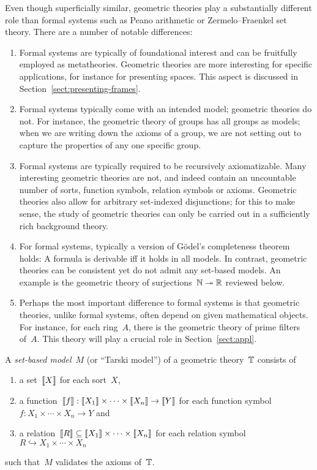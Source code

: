 \documentclass{ws-rv9x6}
\begin{document}
{{\begin{table}[t]
{\begin{minipage}{0.8\textwidth}
  \end{minipage}}
  \label{table:first-order-logic}
\end{table}}

Even though superficially similar, geometric theories play a
substantially different role than formal systems such as Peano arithmetic or
Zermelo--Fraenkel set theory. There are a number of notable differences:
\begin{enumerate}
\item Formal systems are typically of foundational interest and can be
fruitfully employed as metatheories. Geometric theories are more interesting
for specific applications, for instance for presenting spaces. This aspect is discussed
in Section~\ref{sect:presenting-frames}.
\item Formal systems typically come with an intended model; geometric theories
do not. For instance, the geometric theory of groups has all groups as models;
when we are writing down the axioms of a group, we are not setting out to
capture the properties of any one specific group.
\item Formal systems are typically required to be recursively
axiomatizable. Many interesting geometric theories are not, and indeed contain
an uncountable number of sorts, function symbols, relation symbols or axioms. Geometric theories also allow for arbitrary
set-indexed disjunctions; for this to make sense, the study of geometric
theories can only be carried out in a sufficiently rich background theory.
\item For formal systems, typically a version of Gödel's completeness theorem
holds: A formula is derivable iff it holds in all models. In contrast,
geometric theories can be consistent yet do not admit any set-based models. An
example is the geometric theory of surjections~$\mathbb{N} \twoheadrightarrow \mathbb{R}$
reviewed below.
\item Perhaps the most important difference to formal systems is that geometric
theories, unlike formal systems, often depend on given mathematical objects. For instance, for each
ring~$A$, there is the geometric theory of prime filters of~$A$. This theory
will play a crucial role in Section~\ref{sect:appl}.
\end{enumerate}

\begin{definition}A \emph{set-based model}~$M$ (or ``Tarski model'') of a
geometric theory~$\mathbb{T}$ consists of
\begin{enumerate}
  \item a set~${\llbracket{X}\rrbracket}$ for each sort~$X$,
  \item a function~${\llbracket{f}\rrbracket} : {\llbracket{X_1}\rrbracket} \times \cdots \times {\llbracket{X_n}\rrbracket} \to
  {\llbracket{Y}\rrbracket}$
  for each function symbol~$f : X_1 \times \cdots \times X_n \to Y$ and
  \item a relation~${\llbracket{R}\rrbracket} \subseteq {\llbracket{X_1}\rrbracket} \times \cdots \times {\llbracket{X_n}\rrbracket}$
  for each relation symbol~$R \hookrightarrow X_1 \times \cdots \times X_n$
\end{enumerate}
such that~$M$ validates the axioms of~$\mathbb{T}$.
\end{definition}

}
\end{document}
